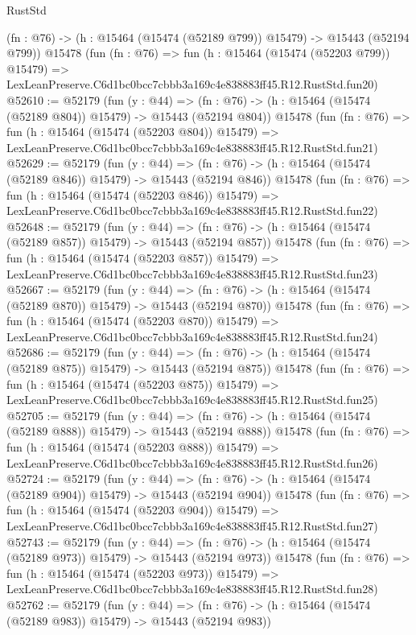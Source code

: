 \begin{lexlean}{RustStd}
\begin{coremodule}
    (fn : @76) -> (h : @15464 (@15474 (@52189 @799)) @15479) -> @15443 (@52194 @799))
    @15478
    (fun (fn : @76) =>
    fun (h : @15464 (@15474 (@52203 @799)) @15479) =>
    LexLeanPreserve.C6d1bc0bcc7cbbb3a169c4e838883ff45.R12.RustStd.fun20)
@52610 := @52179
    (fun (y : @44) =>
    (fn : @76) -> (h : @15464 (@15474 (@52189 @804)) @15479) -> @15443 (@52194 @804))
    @15478
    (fun (fn : @76) =>
    fun (h : @15464 (@15474 (@52203 @804)) @15479) =>
    LexLeanPreserve.C6d1bc0bcc7cbbb3a169c4e838883ff45.R12.RustStd.fun21)
@52629 := @52179
    (fun (y : @44) =>
    (fn : @76) -> (h : @15464 (@15474 (@52189 @846)) @15479) -> @15443 (@52194 @846))
    @15478
    (fun (fn : @76) =>
    fun (h : @15464 (@15474 (@52203 @846)) @15479) =>
    LexLeanPreserve.C6d1bc0bcc7cbbb3a169c4e838883ff45.R12.RustStd.fun22)
@52648 := @52179
    (fun (y : @44) =>
    (fn : @76) -> (h : @15464 (@15474 (@52189 @857)) @15479) -> @15443 (@52194 @857))
    @15478
    (fun (fn : @76) =>
    fun (h : @15464 (@15474 (@52203 @857)) @15479) =>
    LexLeanPreserve.C6d1bc0bcc7cbbb3a169c4e838883ff45.R12.RustStd.fun23)
@52667 := @52179
    (fun (y : @44) =>
    (fn : @76) -> (h : @15464 (@15474 (@52189 @870)) @15479) -> @15443 (@52194 @870))
    @15478
    (fun (fn : @76) =>
    fun (h : @15464 (@15474 (@52203 @870)) @15479) =>
    LexLeanPreserve.C6d1bc0bcc7cbbb3a169c4e838883ff45.R12.RustStd.fun24)
@52686 := @52179
    (fun (y : @44) =>
    (fn : @76) -> (h : @15464 (@15474 (@52189 @875)) @15479) -> @15443 (@52194 @875))
    @15478
    (fun (fn : @76) =>
    fun (h : @15464 (@15474 (@52203 @875)) @15479) =>
    LexLeanPreserve.C6d1bc0bcc7cbbb3a169c4e838883ff45.R12.RustStd.fun25)
@52705 := @52179
    (fun (y : @44) =>
    (fn : @76) -> (h : @15464 (@15474 (@52189 @888)) @15479) -> @15443 (@52194 @888))
    @15478
    (fun (fn : @76) =>
    fun (h : @15464 (@15474 (@52203 @888)) @15479) =>
    LexLeanPreserve.C6d1bc0bcc7cbbb3a169c4e838883ff45.R12.RustStd.fun26)
@52724 := @52179
    (fun (y : @44) =>
    (fn : @76) -> (h : @15464 (@15474 (@52189 @904)) @15479) -> @15443 (@52194 @904))
    @15478
    (fun (fn : @76) =>
    fun (h : @15464 (@15474 (@52203 @904)) @15479) =>
    LexLeanPreserve.C6d1bc0bcc7cbbb3a169c4e838883ff45.R12.RustStd.fun27)
@52743 := @52179
    (fun (y : @44) =>
    (fn : @76) -> (h : @15464 (@15474 (@52189 @973)) @15479) -> @15443 (@52194 @973))
    @15478
    (fun (fn : @76) =>
    fun (h : @15464 (@15474 (@52203 @973)) @15479) =>
    LexLeanPreserve.C6d1bc0bcc7cbbb3a169c4e838883ff45.R12.RustStd.fun28)
@52762 := @52179
    (fun (y : @44) =>
    (fn : @76) -> (h : @15464 (@15474 (@52189 @983)) @15479) -> @15443 (@52194 @983))

\end{coremodule}
\end{lexlean}
